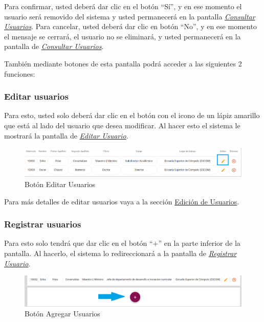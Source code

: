 \begin{enumerate}
\begin{figure}[!hbtp]
                \end{figure}

                Para confirmar, usted deberá dar clic en el botón “Sí”, y en ese momento el usuario será removido del sistema y usted permanecerá en la pantalla \hyperlink{consultarUs}{\textit{Consultar Usuarios}}.
                Para cancelar, usted deberá dar clic en botón “No”, y en ese momento el mensaje se cerrará, el usuario no se eliminará, y usted permanecerá en la pantalla de \hyperlink{consultarUs}{\textit{Consultar Usuarios}}.

        \end{enumerate}

        También mediante botones de esta pantalla podrá acceder a las siguientes 2 funciones:

        \subsubsection{Editar usuarios}

            Para esto, usted solo deberá dar clic en el botón con el icono de un lápiz amarillo que está al lado del usuario que desea modificar. Al hacer esto el sistema le mostrará la pantalla   de \hyperlink{editarUs}{\textit{Editar Usuario}}.

            \begin{figure}[!hbtp]
                \centering
                \hypertarget{editar}{\includegraphics[width=0.7\linewidth]{images/SP5/BtnEditar}}
                \caption{Botón Editar Usuarios}
                \label{editar}
            \end{figure}

            Para más detalles de editar usuarios vaya a la sección \hyperlink{editar-user}{Edición de Usuarios}.

        \subsubsection{Registrar  usuarios}

            Para esto solo tendrá que dar clic en el botón “+” en la parte inferior de la pantalla. Al hacerlo, el sistema  lo redireccionará a la pantalla de \hyperlink{registrarUs}{\textit{Registrar Usuario}}.

            \begin{figure}[!hbtp]
                \centering
                \hypertarget{add}{\includegraphics[width=0.7\linewidth]{images/SP5/BtnAgregar}}
                \caption{Botón Agregar Usuarios}
                \label{add}
            \end{figure}

